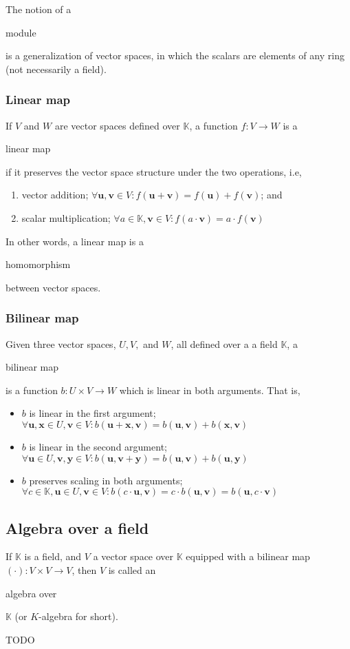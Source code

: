 \documentclass{article}
\newenvironment{itemized}{ 
\begin{itemize}
\setlength{\itemsep}{0pt}
\setlength{\parskip}{0pt}
\setlength{\parsep}{0pt}     
}{\end{itemize}}
\newenvironment{enumerated}{ 
\begin{enumerate}
\setlength{\itemsep}{0pt}
\setlength{\parskip}{0pt}
\setlength{\parsep}{0pt}     
}{\end{enumerate}}
\renewcommand{\vec}[1]{\mathbf{#1}}
\begin{document}
The notion of a \begin{em}module\end{em} is a generalization of vector spaces, in which the scalars are elements of any ring (not necessarily a field).

\subsubsection*{Linear map}

If $V$ and $W$ are vector spaces defined over $\mathbb{K}$, a function $f : V \rightarrow W$ is a \begin{em}linear map\end{em} if it preserves the vector space structure under the two operations, i.e,

  \begin{enumerated}
    \item vector addition; $ \forall \vec{u}, \vec{v} \in V : f(\vec{u} + \vec{v}) = f(\vec{u}) + f(\vec{v}) $; and
    \item scalar multiplication; $ \forall a \in \mathbb{K}, \vec{v} \in V : f(a \cdot \vec{v}) = a \cdot f(\vec{v}) $
  \end{enumerated}

In other words, a linear map is a \begin{em}homomorphism\end{em} between vector spaces.

\subsubsection*{Bilinear map}

Given three vector spaces, $U, V, $ and $W$, all defined over a a field $\mathbb{K}$, a \begin{em}bilinear map\end{em} is a function $b : U \times V \rightarrow W$ which is linear in both arguments. That is,

  \begin{itemized}
    \item $b$ is linear in the first argument; $ \forall \vec{u}, \vec{x} \in U, \vec{v} \in V : b(\vec{u} + \vec{x}, \vec{v}) = b(\vec{u}, \vec{v}) + b(\vec{x}, \vec{v}) $
    \item $b$ is linear in the second argument; $ \forall \vec{u} \in U, \vec{v}, \vec{y} \in V : b(\vec{u}, \vec{v} + \vec{y}) = b(\vec{u}, \vec{v}) + b(\vec{u}, \vec{y}) $
    \item $b$ preserves scaling in both arguments; $ \forall c \in \mathbb{K}, \vec{u} \in U, \vec{v} \in V : b(c \cdot \vec{u}, \vec{v}) = c \cdot b(\vec{u}, \vec{v}) = b(\vec{u}, c \cdot \vec{v}) $
  \end{itemized}

\subsection*{Algebra over a field}

If $\mathbb{K}$ is a field, and $V$ a vector space over $\mathbb{K}$ equipped with a bilinear map $(\cdot) : V \times V \rightarrow V$, then $V$ is called an \begin{em}algebra over\end{em} $\mathbb{K}$ (or $K$-algebra for short).

  TODO
\end{document}
